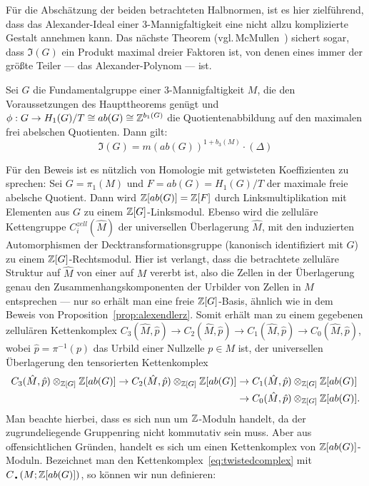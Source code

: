     Für die Abschätzung der beiden betrachteten Halbnormen, ist es hier zielführend, dass das Alexander-Ideal einer 3-Mannigfaltigkeit eine nicht allzu komplizierte Gestalt annehmen kann. Das nächste Theorem (vgl.\,McMullen~\cite{MCMULLEN.2002}) sichert sogar, dass $\mathfrak I(G)$ ein Produkt maximal dreier Faktoren ist, von denen eines immer der größte Teiler --- das Alexander-Polynom --- ist. 

\begin{thm}
\label{thm:keralexnorm}
	Sei $G$ die Fundamentalgruppe einer 3-Mannigfaltigkeit $M$, die den Voraussetzungen des Haupttheorems genügt und $\phi:G \to H_1(G)/T \cong ab(G) \cong \mathbb{Z}^{b_1(G)}$ die Quotientenabbildung auf den maximalen frei abelschen Quotienten. Dann gilt:
	\[
		\mathfrak I(G) = m(ab(G))^{1+b_3(M)}\cdot (\Delta) 
	\]
\end{thm}

	Für den Beweis ist es nützlich von Homologie mit getwisteten Koeffizienten zu sprechen: Sei $G=\pi_1(M)$ und $F=ab(G)=H_1(G)/T$ der maximale freie abelsche Quotient. Dann wird $\mathbb{Z}[ab(G)]=\mathbb{Z}[F]$ durch Linksmultiplikation mit Elementen aus $G$ zu einem $\mathbb{Z}[G]$-Linksmodul. Ebenso wird die zelluläre Kettengruppe $C^{zell}_i(\hat M)$ der universellen Überlagerung $\hat M$, mit den induzierten Automorphismen der Decktransformationsgruppe (kanonisch identifiziert mit $G$) zu einem $\mathbb{Z}[G]$-Rechtsmodul. Hier ist verlangt, dass die betrachtete zelluläre Struktur auf $\hat M$ von einer auf $M$ vererbt ist, also die Zellen in der Überlagerung genau den Zusammenhangskomponenten der Urbilder von Zellen in $M$ entsprechen --- nur so erhält man eine freie $\mathbb{Z}[G]$-Basis, ähnlich wie in dem Beweis von Proposition~\ref{prop:alexendlerz}. Somit erhält man zu einem gegebenen zellulären Kettenkomplex $C_3(\hat M,\hat p) \to C_2(\hat M,\hat p) \to C_1(\hat M,\hat p) \to C_0(\hat M,\hat p)$, wobei $\hat p = \pi^{-1}(p)$ das Urbild einer Nullzelle $p\in M$ ist, der universellen Überlagerung den tensorierten Kettenkomplex 
\begin{align}
			C_3(\hat M,\hat p)\otimes_{\mathbb{Z}[G]}\mathbb{Z}[ab(G)] \to C_2(\hat M,\hat p)\otimes_{\mathbb{Z}[G]}\mathbb{Z}[ab(G)]& \to C_1(\hat M,\hat p)\otimes_{\mathbb{Z}[G]}\mathbb{Z}[ab(G)] \label{eq:twistedcomplex}\\
			& \to C_0(\hat M,\hat p)\otimes_{\mathbb{Z}[G]}\mathbb{Z}[ab(G)]  \notag .
	\end{align}	
	Man beachte hierbei, dass es sich nun um $\mathbb{Z}$-Moduln handelt, da der zugrundeliegende Gruppenring nicht kommutativ sein muss. Aber aus offensichtlichen Gründen, handelt es sich um einen Kettenkomplex von $\mathbb{Z}[ab(G)]$-Moduln. Bezeichnet man den Kettenkomplex~\eqref{eq:twistedcomplex} mit $C_\text{\textbullet}(M;\ZZ[ab(G)])$, so können wir nun definieren:

